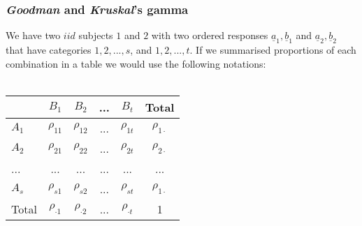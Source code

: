 \documentclass[]{article}
\begin{document}
\subsubsection{\emph{Goodman} and \emph{Kruskal}'s gamma}
\label{sssec:GoodmanKruskal}
We have two $iid$ subjects $1$ and $2$ with two ordered responses $\underline{a}_1,\underline{b}_1$ and $\underline{a}_2,\underline{b}_2$ that have categories $1,2,...,s$, and $1,2,...,t$. If we summarised proportions of each combination in a table we would use the following notations:\\
~\\
\begin{tabular}{ l | c | c | c | c | c}
  \hline
  ~ & $B_1$ & $B_2$ & ... & $B_t$ & Total\\
  \hline
  $A_1$ & $\rho_{11}$&$\rho_{12}$&... &$\rho_{1t}$& $\rho_{1\cdot}$\\
  $A_2$ & $\rho_{21}$&$\rho_{22}$&... &$\rho_{2t}$& $\rho_{2\cdot}$\\
  ... & ...&...&... &...& ...\\
  $A_s$ & $\rho_{s1}$&$\rho_{s2}$&... &$\rho_{st}$& $\rho_{1\cdot}$\\
  \hline
  Total & $\rho_{\cdot 1}$& $\rho_{\cdot 2}$&... & $\rho_{\cdot t}$& 1\\
\end{tabular}
~\\
\end{document}
